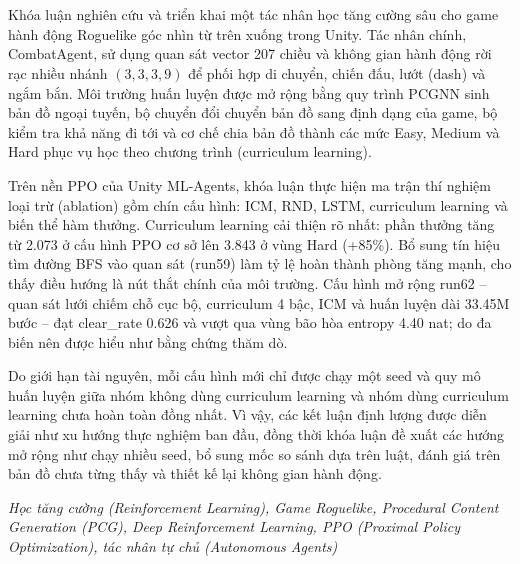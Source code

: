 \clearpage
{}

\chapter*{\fontsize{13}{13}\selectfont{Tóm tắt}}

Khóa luận nghiên cứu và triển khai một tác nhân học tăng cường sâu cho game hành động Roguelike góc nhìn từ trên xuống trong Unity. Tác nhân chính, CombatAgent, sử dụng quan sát vector 207 chiều và không gian hành động rời rạc nhiều nhánh $(3,3,3,9)$ để phối hợp di chuyển, chiến đấu, lướt (dash) và ngắm bắn. Môi trường huấn luyện được mở rộng bằng quy trình PCGNN sinh bản đồ ngoại tuyến, bộ chuyển đổi chuyển bản đồ sang định dạng của game, bộ kiểm tra khả năng đi tới và cơ chế chia bản đồ thành các mức Easy, Medium và Hard phục vụ học theo chương trình (curriculum learning).

Trên nền PPO của Unity ML-Agents, khóa luận thực hiện ma trận thí nghiệm loại trừ (ablation) gồm chín cấu hình: ICM, RND, LSTM, curriculum learning và biến thể hàm thưởng. Curriculum learning cải thiện rõ nhất: phần thưởng tăng từ 2.073 ở cấu hình PPO cơ sở lên 3.843 ở vùng Hard (+85\%). Bổ sung tín hiệu tìm đường BFS vào quan sát (run59) làm tỷ lệ hoàn thành phòng tăng mạnh, cho thấy điều hướng là nút thắt chính của môi trường. Cấu hình mở rộng run62 -- quan sát lưới chiếm chỗ cục bộ, curriculum 4 bậc, ICM và huấn luyện dài 33.45M bước -- đạt clear\_rate 0.626 và vượt qua vùng bão hòa entropy 4.40 nat; do đa biến nên được hiểu như bằng chứng thăm dò.

Do giới hạn tài nguyên, mỗi cấu hình mới chỉ được chạy một seed và quy mô huấn luyện giữa nhóm không dùng curriculum learning và nhóm dùng curriculum learning chưa hoàn toàn đồng nhất. Vì vậy, các kết luận định lượng được diễn giải như xu hướng thực nghiệm ban đầu, đồng thời khóa luận đề xuất các hướng mở rộng như chạy nhiều seed, bổ sung mốc so sánh dựa trên luật, đánh giá trên bản đồ chưa từng thấy và thiết kế lại không gian hành động.

\vspace{0.5cm}
 \textit{Học tăng cường (Reinforcement Learning), Game Roguelike, Procedural Content Generation (PCG), Deep Reinforcement Learning, PPO (Proximal Policy Optimization), tác nhân tự chủ (Autonomous Agents)}
